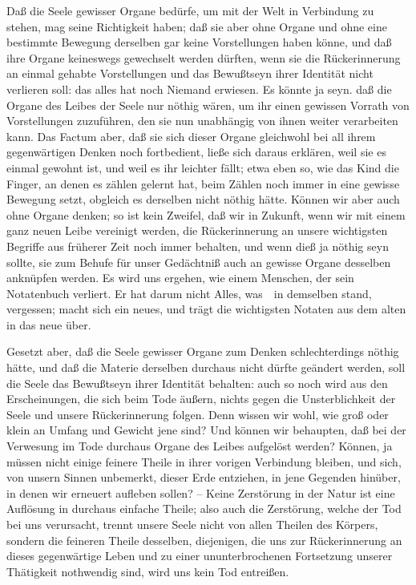 \begin{RWanm}
\begin{aufza}
\item Daß die Seele gewisser Organe bedürfe, um mit der Welt in Verbindung zu stehen, mag seine Richtigkeit haben; daß sie aber ohne Organe und ohne eine bestimmte Bewegung derselben gar keine Vorstellungen haben könne, und daß ihre Organe keineswegs gewechselt werden dürften, wenn sie die Rückerinnerung an einmal gehabte Vorstellungen und das Bewußtseyn ihrer Identität nicht verlieren soll: das alles hat noch Niemand erwiesen. Es könnte ja seyn. daß die Organe des Leibes der Seele nur nöthig wären, um ihr einen gewissen Vorrath von Vorstellungen zuzuführen, den sie nun unabhängig von ihnen weiter verarbeiten kann. Das Factum aber, daß sie sich dieser Organe gleichwohl bei all ihrem gegenwärtigen Denken noch fortbedient, ließe sich daraus erklären, weil sie es einmal gewohnt ist, und weil es ihr leichter fällt; etwa eben so, wie das Kind die Finger, an denen es zählen gelernt hat, beim Zählen noch immer in eine gewisse Bewegung setzt, obgleich es derselben nicht nöthig hätte. Können wir aber auch ohne Organe denken; so ist kein Zweifel, daß wir in Zukunft, wenn wir mit einem ganz neuen Leibe vereinigt werden, die Rückerinnerung an unsere wichtigsten Begriffe aus früherer Zeit noch immer behalten, und wenn dieß ja nöthig seyn sollte, sie zum Behufe für unser Gedächtniß auch an gewisse Organe desselben anknüpfen werden. Es wird uns ergehen, wie einem Menschen, der sein Notatenbuch verliert. Er hat darum nicht Alles, was~\ in demselben stand, vergessen; macht sich ein neues, und trägt die wichtigsten Notaten aus dem alten in das neue über.
\item Gesetzt aber, daß die Seele gewisser Organe zum Denken schlechterdings nöthig hätte, und daß die Materie derselben durchaus nicht dürfte geändert werden, soll die Seele das Bewußtseyn ihrer Identität behalten: auch so noch wird aus den Erscheinungen, die sich beim Tode äußern, nichts gegen die Unsterblichkeit der Seele und unsere Rückerinnerung folgen. Denn wissen wir wohl, wie groß oder klein an Umfang und Gewicht jene  sind? Und können wir behaupten, daß bei der Verwesung im Tode durchaus  Organe des Leibes aufgelöst werden? Können, ja müssen nicht einige feinere Theile in ihrer vorigen Verbindung bleiben, und sich, von unsern Sinnen unbemerkt, dieser Erde entziehen, in jene Gegenden hinüber, in denen wir erneuert aufleben sollen? -- Keine Zerstörung in der Natur ist eine Auflösung in durchaus einfache Theile; also auch die Zerstörung, welche der Tod bei uns verursacht, trennt unsere Seele nicht von allen Theilen des Körpers, sondern die feineren Theile desselben, diejenigen, die uns zur Rückerinnerung an dieses gegenwärtige Leben und zu einer ununterbrochenen Fortsetzung unserer Thätigkeit nothwendig sind, wird uns kein Tod entreißen.
\end{aufza}
\end{RWanm}
\clearpage

